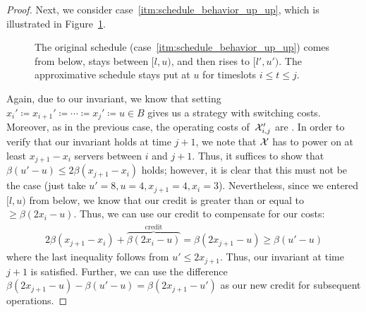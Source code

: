 \begin{proof}
Next, we consider case~\ref{itm:schedule_behavior_up_up}, which is illustrated in Figure~\ref{fig:schedule_behavior_up_up}.
\begin{figure}[ht]
\centering
	
\caption{The original schedule (case~\ref{itm:schedule_behavior_up_up}) comes from below, stays between $[l,u)$, and then rises to $[l',u')$. The approximative schedule stays put at $u$ for timeslots $i\le t\le j$.}
\label{fig:schedule_behavior_up_up}
\end{figure}
Again, due to our invariant, we know that setting $x_i'\coloneqq x_{i+1}'\coloneqq\dotsb\coloneqq x_j'\coloneqq u\in B$ gives us a strategy with  switching costs. Moreover, as in the previous case, the operating costs of~$\mathcal{X}_{i,j}'$ are . In order to verify that our invariant holds at time $j+1$, we note that $\mathcal{X}$ has to power on at least $x_{j+1}-x_i$ servers between $i$ and $j+1$. Thus, it suffices to show that $\beta(u'-u)\le2\beta(x_{j+1}-x_i)$ holds; however, it is clear that this must not be the case (just take $u'=8,u=4,x_{j+1}=4,x_i=3$). Nevertheless, since we entered $[l,u)$ from below, we know that our credit is greater than or equal to $\ge\beta(2x_i-u)$. Thus, we can use our credit to compensate for our costs:
\begin{align*}
	2\beta(x_{j+1}-x_i)+\overbrace{\beta(2x_i-u)}^{\text{credit}}=\beta(2x_{j+1}-u)\ge\beta(u'-u)
\end{align*}
where the last inequality follows from $u'\le2x_{j+1}$. Thus, our invariant at time $j+1$ is satisfied. Further, we can use the difference $\beta(2x_{j+1}-u)-\beta(u'-u)=\beta(2x_{j+1}-u')$ as our new credit for subsequent operations. 
	

\end{proof}
